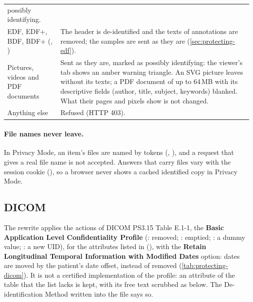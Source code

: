 \begin{xltabular}{\linewidth}{@{}P{3.6cm}L@{}}
  possibly identifying. \\
EDF, EDF+, BDF, BDF+ (, ) & The header is de-identified and the texts of
  annotations are removed; the samples are sent as they are (\cref{sec:protecting-edf}). \\
Pictures, videos and PDF documents & Sent as they are, marked as possibly identifying: the
  viewer's tab shows an amber warning triangle. An SVG picture leaves without its texts; a PDF
  document of up to 64\,MB with its descriptive fields (author, title, subject, keywords) blanked.
  What their pages and pixels show is not changed. \\
Anything else & Refused (HTTP 403). \\
\end{xltabular}

\paragraph{File names never leave.} In Privacy Mode, an item's files are named by tokens
(, ), and a request that gives a real file name is not
accepted. Answers that carry files vary with the session cookie (), so a
browser never shows a cached identified copy in Privacy Mode.

\subsection{DICOM}
\label{sec:protecting-dicom}

The rewrite applies the actions of DICOM PS3.15 Table E.1-1, the \textbf{Basic Application
Level Confidentiality Profile} (: removed; : emptied; : a dummy value;
: a new UID), for the attributes listed in  (), with the
\textbf{Retain Longitudinal Temporal Information with Modified Dates} option: dates are moved by
the patient's date offset, instead of removed (\cref{tab:protecting-dicom}). It is not a
certified implementation of the profile: an attribute of the table that the list lacks is kept,
with its free text scrubbed as below. The De-identification Method written into the file says
so.

